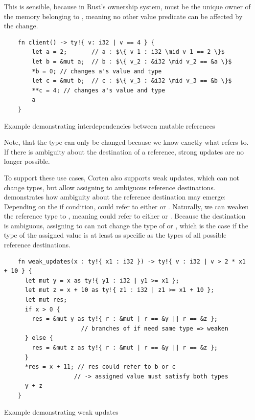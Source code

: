 \documentclass[twoside, english]{sdqthesis}
\theoremstyle{definition}
\begin{document}
This is sensible, because in Rust's ownership system,  must be the unique owner of the memory belonging to , meaning no other value predicate can be affected by the change.

\begin{listing}[ht]
  \begin{verbatim}
    fn client() -> ty!{ v: i32 | v == 4 } {
        let a = 2;       // a : $\{ v_1 : i32 \mid v_1 == 2 \}$
        let b = &mut a;  // b : $\{ v_2 : &i32 \mid v_2 == &a \}$
        *b = 0; // changes a's value and type
        let c = &mut b;  // c : $\{ v_3 : &i32 \mid v_3 == &b \}$
        **c = 4; // changes a's value and type
        a
    }
  \end{verbatim}
  \caption{Example demonstrating interdependencies between mutable references}
  \label{lst:mutation-strong}
\end{listing}

Note, that the type can only be changed because we know exactly what  refers to. If there is ambiguity about the destination of a reference, strong updates are no longer possible.

To support these use cases, Corten also supports weak updates, which can not change types, but allow assigning to ambiguous reference destinations.
 demonstrates how ambiguity about the reference destination may emerge: Depending on the if condition,  could refer to either  or .
Naturally, we can weaken the reference type to , meaning  could refer to either  or .
Because the destination is ambiguous, assigning to  can not change the type of  or , which is the case if the type of the assigned value is at least as specific as the types of all possible reference destinations.

\begin{listing}[ht]
  \begin{verbatim}
    fn weak_updates(x : ty!{ x1 : i32 }) -> ty!{ v : i32 | v > 2 * x1 + 10 } {
      let mut y = x as ty!{ y1 : i32 | y1 >= x1 };
      let mut z = x + 10 as ty!{ z1 : i32 | z1 >= x1 + 10 };
      let mut res;
      if x > 0 {
        res = &mut y as ty!{ r : &mut | r == &y || r == &z };
                      // branches of if need same type => weaken
      } else {
        res = &mut z as ty!{ r : &mut | r == &y || r == &z };
      }
      *res = x + 11; // res could refer to b or c 
                    // -> assigned value must satisfy both types
      y + z
    }
  \end{verbatim}
  \caption{Example demonstrating weak updates}
  \label{lst:mutation-weak}
\end{listing}
\end{document}
